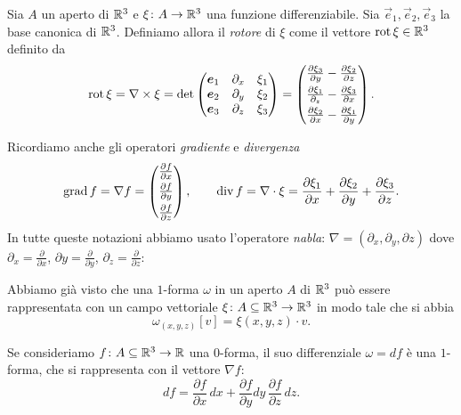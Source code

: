 \begin{definition}[rotore]
Sia $A$ un aperto di ${\mathbb R}^3$ e $\xi \colon A \to {\mathbb R}^3$ una funzione differenziabile.
Sia $\vec e_1,\vec e_2,\vec e_3$ la base canonica di ${\mathbb R}^3$.
Definiamo allora il \emph{rotore} di $\xi$ come il vettore $\operatorname{rot} \xi \in {\mathbb R}^3$ 
definito da 
\[
   \rot \xi = \nabla \times \xi
    = \det \begin{pmatrix}
    \vec e_1 & \partial_x & \xi_1 \\
    \vec e_2 & \partial_y & \xi_2 \\
    \vec e_3 & \partial_z & \xi_3 
    \end{pmatrix}
    = \begin{pmatrix}
    \frac{\partial \xi_3}{\partial y} - \frac{\partial \xi_2}{\partial z} \smallskip \\
    \frac{\partial \xi_1}{\partial_z} - \frac{\partial \xi_3}{\partial x} \smallskip \\
    \frac{\partial \xi_2}{\partial x} - \frac{\partial \xi_1}{\partial y}
    \end{pmatrix}.
\]

Ricordiamo anche gli operatori \emph{gradiente} e \emph{divergenza}
\[
  \grad f = \nabla f = \begin{pmatrix}
     \frac{\partial f}{\partial x} \smallskip \\
     \frac{\partial f}{\partial y} \smallskip \\
     \frac{\partial f}{\partial z}
  \end{pmatrix}, \qquad 
  \div f = \nabla \cdot \xi = \frac{\partial \xi_1}{\partial x} + \frac{\partial \xi_2}{\partial y} + \frac{\partial \xi_3}{\partial z}.
\]
In tutte queste notazioni abbiamo usato l'operatore \emph{nabla}: $\nabla = (\partial_x, \partial_y, \partial z)$
dove $\partial_x = \frac{\partial}{\partial x}$, $\partial y = \frac{\partial}{\partial y}$, $\partial_z = \frac{\partial}{\partial z}$:
\end{definition}

Abbiamo già visto che una $1$-forma $\omega$ in un aperto $A$ di ${\mathbb R}^3$ può essere rappresentata 
con un campo vettoriale $\xi\colon A \subseteq {\mathbb R}^3 \to {\mathbb R}^3$ 
in modo tale che si abbia 
\[
  \omega_{(x,y,z)}[v] = \xi(x,y,z)\cdot v.
\]

Se consideriamo $f\colon A\subseteq {\mathbb R}^3\to {\mathbb R}$ una $0$-forma, 
il suo differenziale $\omega = df$ è una $1$-forma, che si rappresenta 
con il vettore $\nabla f$:
\[
df = \frac{\partial f}{\partial x}\, dx 
+ \frac{\partial f}{\partial y} dy\, \frac{\partial f}{\partial z}\, dz.
\]

